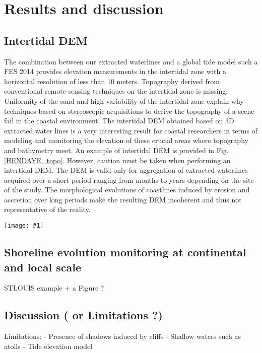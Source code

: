 \documentclass[remotesensing,article,submit,pdftex,moreauthors]{Definitions/mdpi}
\newcommand{\myfigure}[4]{
    \begin{figure*}[h!]
        \centering
        \texttt{[image: \#1]}	 
        \caption{\itshape#2}
        \label{#3}
    \end{figure*} 
}
\begin{document}
    
\section{Results and discussion}

    \subsection{Intertidal DEM}
    The combination between our extracted waterlines and a global tide model such a FES 2014 \citep{carrere2016fes} provides elevation measurements in the intertidal zone with a horizontal resolution of less than 10 meters.
    Topography derived from conventional remote sensing techniques on the intertidal zone is missing.
    Uniformity of the sand and high variability of the intertidal zone explain why techniques based on stereoscopic acquisitions to derive the topography of a scene fail in the coastal environment.
    The intertidal DEM obtained based on 3D extracted water lines is a very interesting result for coastal researchers in terms of modeling and monitoring the elevation of these crucial areas where topography and bathymetry meet.
    An example of intertidal DEM is provided in Fig.\ref{HENDAYE_topo}.
    However, caution must be taken when performing an intertidal DEM.
    The DEM is valid only for aggregation of extracted waterlines acquired over a short period ranging from months to years depending on the site of the study.
    The morphological evolutions of coastlines induced by erosion and accretion over long periods make the resulting DEM incoherent and thus not representative of the reality.
    
    \myfigure{img/HENDAYE_shoreline_DEM.png}{An example of intertidal DEM on Hendaye beach, SW France. It was obtained from the combination of the extracted instantaneous waterlines and the predicted water levels of each waterline point with FES2014 global tide model of Sentinel-2 acquisition from XX to XX.}{HENDAYE_topo}{1}

    \subsection{Shoreline evolution monitoring at continental and local scale}
    STLOUIS example + a Figure ?


    \subsection{Discussion ( or Limitations ?)}
    Limitations:
    - Presence of shadows induced by cliffs
    - Shallow waters such as atolls
    - Tide elevation model
\end{document}
